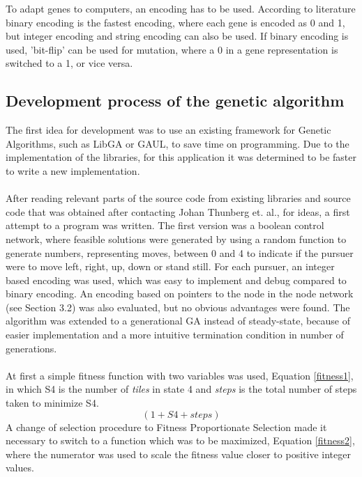 To adapt genes to computers, an encoding has to be used.  According to literature \cite{GAHandbook1} binary encoding is the fastest encoding, where each gene is encoded as 0 and 1, but integer encoding and string encoding can also be used. If binary encoding is used, 'bit-flip' can be used for mutation, where a 0 in a gene representation is switched to a 1, or vice versa.
\subsection{Development process of the genetic algorithm}\label{geneticdevelopment}
The first idea for development was to use an existing framework for Genetic Algorithms, such as LibGA \cite{libGA} %
or GAUL\cite{GAUL}, to save time on programming. Due to the implementation of the libraries, for this application it was determined to be faster to write a new implementation.\\\\
%
After reading relevant parts of the source code from existing libraries and source code that was obtained after contacting Johan Thunberg et. al., for ideas, a first attempt to a program was written. The first version was a boolean control network, where feasible solutions were generated by using a random function to generate numbers, representing moves, between 0 and 4 to indicate if the pursuer were to move left, right, up, down or stand still. For each pursuer, an integer based encoding was used, which was easy to implement and debug compared to binary encoding. An encoding based on pointers to the node in the node network (see Section 3.2) was also evaluated, but no obvious advantages were found. The algorithm was extended to a generational GA instead of steady-state, because of easier implementation and a more intuitive termination condition in number of generations.\\\\
At first a simple fitness function with two variables was used, Equation \eqref{fitness1}, in which S4 is the number of \emph{tiles} in state 4 and \textit{steps} is the total number of steps taken to minimize S4.
%
\begin{equation}\label{fitness1} (1+S4+steps) \end{equation}
%
A change of selection procedure to Fitness Proportionate Selection made it necessary to switch to a function which was to be maximized, Equation \eqref{fitness2}, where the numerator was used to scale the fitness value closer to positive integer values.
